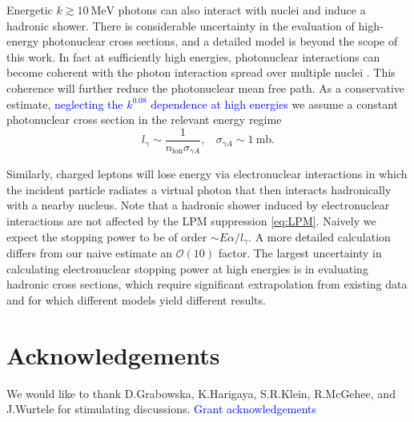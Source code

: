 \documentclass[twocolumn,showpacs,preprintnumbers,amsmath,amssymb,prd]{revtex4}
\newcommand{\OO}{\mathcal{O}}
\begin{document}
\begin{appendices}
Energetic $k \gtrsim 10 ~\text{MeV}$ photons can also interact with nuclei and induce a hadronic shower.
There is considerable uncertainty in the evaluation of high-energy photonuclear cross sections, and a detailed model is beyond the scope of this work.
In fact at sufficiently high energies, photonuclear interactions can become coherent with the photon interaction spread over multiple nuclei \cite{Gerhardt:2010bj}.
This coherence will further reduce the photonuclear mean free path.
As a conservative estimate, \textcolor{blue}{neglecting the $k^{0.08}$ dependence at high energies} we assume a constant photonuclear cross section in the relevant energy regime
\begin{equation}
l_\gamma \sim \frac{1}{n_\text{ion} \sigma_{\gamma A}}, ~~~~ \sigma_{\gamma A} \sim 1 ~\text{mb}.
\end{equation}

Similarly, charged leptons will lose energy via electronuclear interactions in which the incident particle radiates a virtual photon that then interacts hadronically with a nearby nucleus.
Note that a hadronic shower induced by electronuclear interactions are not affected by the LPM suppression \eqref{eq:LPM}.
Naively we expect the stopping power to be of order $\sim E \alpha/l_\gamma$.
A more detailed calculation \cite{Gerhardt:2010bj} differs from our naive estimate an $\OO(10)$ factor.
The largest uncertainty in calculating electronuclear stopping power at high energies is in evaluating hadronic cross sections, which require significant extrapolation from existing data and for which different models yield different results.

\end{appendices}

\section*{Acknowledgements}
We would like to thank D.Grabowska, K.Harigaya, S.R.Klein, R.McGehee, and J.Wurtele for stimulating discussions.
\textcolor{blue}{Grant acknowledgements}


\end{document}
